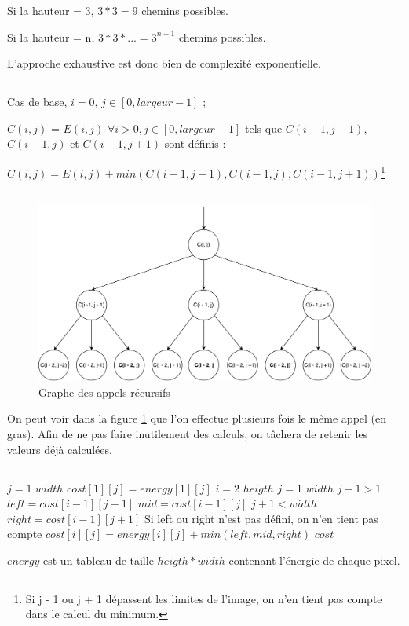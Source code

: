 Si la hauteur = 3, $3*3=9$ chemins possibles.

Si la hauteur = n, $3*3*...=3^{n-1}$ chemins possibles.

L'approche exhaustive est donc bien de complexité exponentielle.
\subsection{} %
Cas de base, $i = 0$, $j \in [0, largeur - 1]$ ;

 $C(i, j)$ = $E(i, j)$
\bigbreak
$\forall i > 0, j \in [0, largeur - 1]$ tels que $C(i - 1, j -1)$, $C(i - 1, j)$ et $C(i - 1, j + 1)$ sont définis :

$C(i, j) = E(i, j) + min(C(i - 1, j -1), C(i - 1, j), C(i - 1, j + 1))$\footnote{Si j - 1 ou j + 1 dépassent les limites de l'image, on n'en tient pas compte dans le calcul du minimum.}
\subsection{} %
\begin{figure}[H]
	\centering
	\includegraphics[width=1\linewidth]{cost.pdf}
	\caption{Graphe des appels récursifs}
	\label{cost}
\end{figure}

On peut voir dans la figure \ref{cost} que l'on effectue plusieurs fois le même appel (en gras). Afin de ne pas faire inutilement des calculs, on tâchera de retenir les valeurs déjà calculées.

\subsection{} %
\begin{codebox}
\li \For $j = 1$ \To $width$
\Do
\li 	$cost[1][j] = energy[1][j]$
\End
\li \For $i = 2$ \To $heigth$
\Do 
\li 	\For $j = 1$ \To $width$
 		\Do
\li 		\If $j - 1> 1$
			\Do 
\li 			$left = cost[i - 1][j - 1]$
\End
\li 		$mid = cost[i - 1][j]$
\li 		\If $j + 1< width$
			\Do 
\li 			$right = cost[i - 1][j + 1]$
\End
\li \Comment Si left ou right n'est pas défini, on n'en tient pas compte
\li 		$cost[i][j] = energy[i][j] + min(left, mid, right)$
	\End
\End
\li \Return $cost$
\end{codebox}
$energy$ est un tableau de taille $heigth * width$ contenant l'énergie de chaque pixel.

